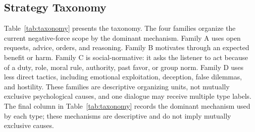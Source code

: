 \documentclass[conference]{IEEEtran}
\begin{document}
\subsection{Strategy Taxonomy}
\label{sec:taxonomy}
Table~\ref{tab:taxonomy} presents the taxonomy. The four families organize
the current negative-force scope by the dominant mechanism. Family A uses
open requests, advice, orders, and reasoning. Family B motivates through an
expected benefit or harm. Family C is social-normative: it asks the listener
to act because of a duty, role, moral rule, authority, past favor, or group
norm. Family D uses less direct tactics, including emotional exploitation,
deception, false dilemmas, and hostility. These families are
descriptive organizing units, not mutually exclusive psychological causes,
and one dialogue may receive multiple type labels. The final column in
Table~\ref{tab:taxonomy} records the dominant mechanism used by each type;
these mechanisms are descriptive and do not imply mutually exclusive causes.
\end{document}
